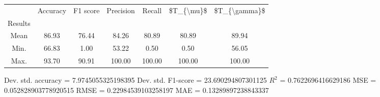 \begin{tabular}{|c|c|c|c|c|c|c|}
\toprule
{} &  Accuracy &  F1 score &  Precision &  Recall &  \$T\_\{\textbackslash mu\}\$ &  \$T\_\{\textbackslash gamma\}\$ \\
Results &           &           &            &         &            &               \\
\hline
Mean    &     86.93 &     76.44 &      84.26 &   80.89 &      80.89 &         89.94 \\
Min.    &     66.83 &      1.00 &      53.22 &    0.50 &       0.50 &         56.05 \\
Max.    &     93.70 &     90.91 &     100.00 &  100.00 &     100.00 &        100.00 \\
\bottomrule
\end{tabular}

 Dev. std. accuracy = 7.9745055325198395
 Dev. std. F1-score = 23.690294807301125
 $R^2$ = 0.7622696416629186
 MSE = 0.052828903778920515
 RMSE = 0.22984539103258197
 MAE = 0.13289897238843337